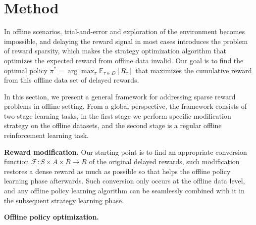 \section{Method}{\label{sec: method}}

In offline scenarios, trial-and-error and exploration of the environment becomes impossible, and delaying the reward signal in most cases introduces the problem of reward sparsity, which makes the strategy optimization algorithm that optimizes the expected reward from offline data invalid. Our goal is to find the optimal policy $\pi^{*} = \arg \max_{\pi} \mathbb E_{\tau \in D} \left[ R_{\tau} \right]$ that maximizes the cumulative reward from this offline data set of delayed rewards.

In this section, we present a general framework for addressing sparse reward problems in offline setting. From a global perspective, the framework consists of two-stage learning tasks, in the first stage we perform specific modification strategy on the offline datasets, and the second stage is a regular offline reinforcement learning task.



\textbf{Reward modification.} Our starting point is to find an appropriate conversion function $\mathcal F: S \times A \times R \rightarrow R$ of the original delayed rewards, such modification restores a dense reward as much as possible so that helps the offline policy learning phase afterwards. Such conversion only occurs at the offline data level, and any offline policy learning algorithm can be seamlessly combined with it in the subsequent strategy learning phase.

\textbf{Offline policy optimization.}

